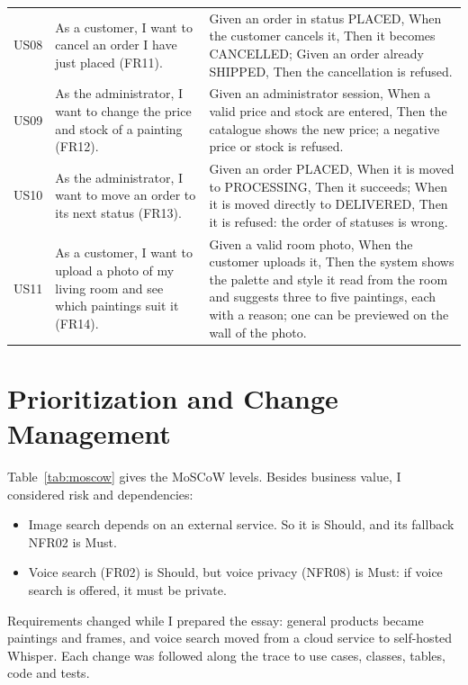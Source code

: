 \begin{longtable}{@{}P{1.1cm}P{5.2cm}P{8.7cm}@{}}
\small US08 & \small As a customer, I want to cancel an order I have just placed (FR11). & \small Given an order in status PLACED, When the customer cancels it, Then it becomes CANCELLED; Given an order already SHIPPED, Then the cancellation is refused.\\
\small US09 & \small As the administrator, I want to change the price and stock of a painting (FR12). & \small Given an administrator session, When a valid price and stock are entered, Then the catalogue shows the new price; a negative price or stock is refused.\\
\small US10 & \small As the administrator, I want to move an order to its next status (FR13). & \small Given an order PLACED, When it is moved to PROCESSING, Then it succeeds; When it is moved directly to DELIVERED, Then it is refused: the order of statuses is wrong.\\
\small US11 & \small As a customer, I want to upload a photo of my living room and see which paintings suit it (FR14). & \small Given a valid room photo, When the customer uploads it, Then the system shows the palette and style it read from the room and suggests three to five paintings, each with a reason; one can be previewed on the wall of the photo.\\
\bottomrule
\end{longtable}

\section{Prioritization and Change Management}\label{sec:1.11}

Table~\ref{tab:moscow} gives the MoSCoW levels. Besides business value, I considered risk and dependencies:
\begin{itemize}
\item Image search depends on an external service. So it is Should, and its fallback NFR02 is Must.
\item Voice search (FR02) is Should, but voice privacy (NFR08) is Must: if voice search is offered, it must be
private.
\end{itemize}



Requirements changed while I prepared the essay: general products became paintings and frames, and voice search
moved from a cloud service to self-hosted Whisper. Each change was followed along the trace to use cases, classes,
tables, code and tests.

